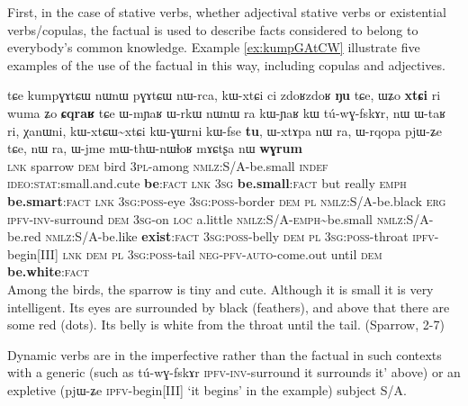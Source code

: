 \documentclass[oldfontcommands,oneside,a4paper,11pt]{article}
\newcommand{\ipa}[1]{{\phon \mbox{#1}}} %
\newcommand{\factual}[1]{\textsc{:fact}}
\begin{document}
First,  in the case of stative verbs, whether adjectival stative verbs or existential verbs/copulas, the factual is used to describe facts considered to belong to everybody's common knowledge. Example \ref{ex:kumpGAtCW} illustrate five examples of the use of the factual in this way, including copulas and adjectives. 

\begin{exe}
\ex \label{ex:kumpGAtCW}
\gll
\ipa{tɕe} 	\ipa{kumpɣɤtɕɯ} 	\ipa{nɯnɯ} 	\ipa{pɣɤtɕɯ} 	\ipa{nɯ-rca,} 
 \ipa{kɯ-xtɕi} 	\ipa{ci} 	\ipa{zdoʁzdoʁ} 	\ipa{\textbf{ŋu}} 	\ipa{tɕe,}  \ipa{ɯʑo} 	\ipa{\textbf{xtɕi}} 	\ipa{ri} 	\ipa{wuma} 	\ipa{ʑo} 	\ipa{\textbf{ɕqraʁ}} \ipa{tɕe}  	\ipa{ɯ-mɲaʁ} 	\ipa{ɯ-rkɯ} 	\ipa{nɯnɯ} 	\ipa{ra} \ipa{kɯ-ɲaʁ} 	\ipa{kɯ} 	\ipa{tú-wɣ-fskɤr,} 	 	\ipa{nɯ} 	\ipa{ɯ-taʁ} 	\ipa{ri,} 	\ipa{χanɯni,} 	\ipa{kɯ-xtɕɯ\textasciitilde{}xtɕi} 	\ipa{kɯ-ɣɯrni} 	\ipa{kɯ-fse} 	\ipa{\textbf{tu},}  	\ipa{ɯ-xtɤpa} 	\ipa{nɯ} \ipa{ra,} 	\ipa{ɯ-rqopa} 	\ipa{pjɯ-ʑe} 	\ipa{tɕe,} 	\ipa{nɯ} \ipa{ra,}  \ipa{ɯ-jme} 	\ipa{mɯ-thɯ-nɯɬoʁ} 	\ipa{mɤɕtʂa} 	\ipa{nɯ} 	\ipa{\textbf{wɣrum}} \\
\textsc{lnk} sparrow \textsc{dem} bird \textsc{3pl}-among \textsc{nmlz}:S/A-be.small \textsc{indef} \textsc{ideo:stat}:small.and.cute \textbf{be}\factual{} \textsc{lnk}  \textsc{3sg} \textbf{be.small}\factual{} but really \textsc{emph} \textbf{be.smart}\factual{}  \textsc{lnk}  \textsc{3sg:poss}-eye \textsc{3sg:poss}-border \textsc{dem}  \textsc{pl}  \textsc{nmlz}:S/A-be.black \textsc{erg} \textsc{ipfv-inv}-surround \textsc{dem} \textsc{3sg}-on \textsc{loc} a.little \textsc{nmlz}:S/A-\textsc{emph}\textasciitilde{}be.small \textsc{nmlz}:S/A-be.red \textsc{nmlz}:S/A-be.like \textbf{exist}\factual{} \textsc{3sg:poss}-belly \textsc{dem}  \textsc{pl}  \textsc{3sg:poss}-throat \textsc{ipfv}-begin[III] \textsc{lnk}   \textsc{dem}  \textsc{pl}  \textsc{3sg:poss}-tail \textsc{neg-pfv-auto}-come.out until \textsc{dem} \textbf{be.white}\factual{} \\
\glt Among the birds, the sparrow is tiny and cute. Although it is small it is very intelligent. Its eyes are surrounded by black (feathers), and above that there are some red (dots). Its belly is white from the throat until the tail. (Sparrow, 2-7)
\end{exe}

 Dynamic verbs   are in the imperfective rather than the factual in such contexts with a generic (such as \ipa{tú-wɣ-fskɤr}  \textsc{ipfv-inv}-surround  it surrounds it' above)  or an expletive (\ipa{pjɯ-ʑe} \textsc{ipfv}-begin[III] `it begins' in the example) subject S/A. 
 
\end{document}
